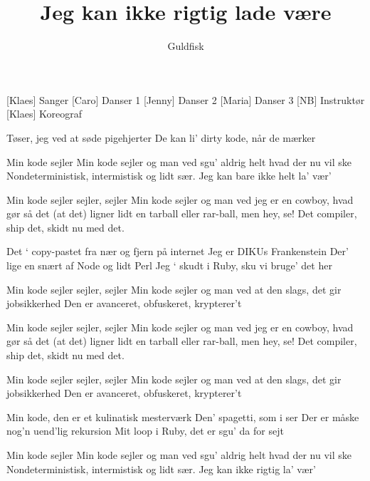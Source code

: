 \documentclass[a4paper,11pt]{article}
\title{Jeg kan ikke rigtig lade være}
\author{Guldfisk}
\begin{document}
\maketitle

\begin{roles}
[Klaes] Sanger
[Caro] Danser 1
[Jenny] Danser 2
[Maria] Danser 3
[NB] Instruktør
[Klaes] Koreograf
\end{roles}

\begin{song}
   Tøser, jeg ved
   at søde pigehjerter
   De kan li’ dirty kode, når de mærker
  
  
   Min kode sejler
   Min kode sejler og man ved
   sgu’ aldrig helt hvad der nu vil ske
   Nondeterministisk, intermistisk og lidt sær.
   Jeg kan bare ikke helt la’ vær’
  
  
   Min kode sejler
   sejler, sejler
   Min kode sejler og man ved
   jeg er en cowboy, hvad gør så det
   (at det) ligner lidt en tarball eller rar-ball, men hey, se!
   Det compiler, ship det, skidt nu med det.
  
   Det ‘ copy-pastet fra nær og fjern på internet
   Jeg er DIKUs Frankenstein
   Der’ lige en snært
   af Node og lidt Perl
   Jeg ‘ skudt i Ruby, sku vi bruge’ det her
  
   Min kode sejler
   sejler, sejler
   Min kode sejler og man ved  
   at den slags, det gir jobsikkerhed
   Den er avanceret,
   obfuskeret, krypterer’t
  

   Min kode sejler
   sejler, sejler
   Min kode sejler og man ved
   jeg er en cowboy, hvad gør så det
   (at det) ligner lidt en tarball eller rar-ball, men hey, se!
   Det compiler, ship det, skidt nu med det.

   Min kode sejler
   sejler, sejler
   Min kode sejler og man ved  
   at den slags, det gir jobsikkerhed
   Den er avanceret,
   obfuskeret, krypterer’t
  
   Min kode, den er et kulinatisk mesterværk
   Den’ spagetti, som i ser
   Der er måske nog’n
   uend’lig rekursion
   Mit loop i Ruby, det er sgu’ da for sejt
  
  
   Min kode sejler
   Min kode sejler og man ved
   sgu’ aldrig helt hvad der nu vil ske
   Nondeterministisk, intermistisk og lidt sær.
   Jeg kan ikke rigtig la’ vær’

\end{song}
\end{document}
